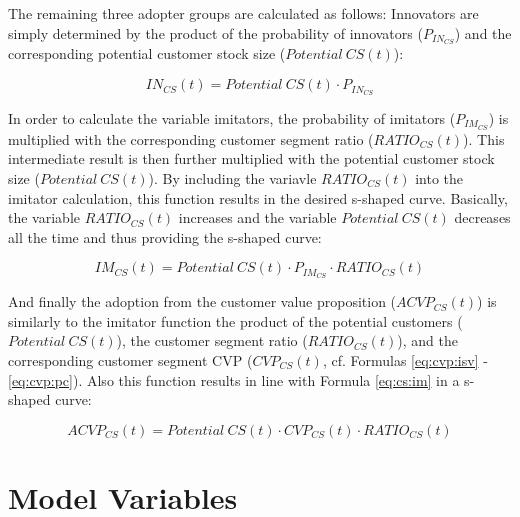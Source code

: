 The remaining three adopter groups are calculated as follows: Innovators are simply determined by the product of the probability of innovators ($P_{IN_{CS}}$) and the corresponding potential customer stock size \linebreak ($\mathit{Potential~CS(t)}$):

\begin{equation}\label{eq:cs:in}
		IN_{CS}(t) = \mathit{Potential~CS(t)} \cdot P_{IN_{CS}}
\end{equation}

In order to calculate the variable imitators, the probability of imitators ($P_{IM_{CS}}$) is multiplied with the corresponding customer segment ratio ($RATIO_{CS}(t)$). This intermediate result is then further multiplied with the potential customer stock size ($\mathit{Potential~CS(t)}$). By including the variavle $RATIO_{CS}(t)$ into the imitator calculation, this function results in the desired s-shaped curve. Basically, the variable $RATIO_{CS}(t)$ increases and the variable $\mathit{Potential~CS(t)}$ decreases all the time and thus providing the s-shaped curve:

\begin{equation}\label{eq:cs:im}
		IM_{CS}(t) = \mathit{Potential~CS(t)} \cdot P_{IM_{CS}} \cdot RATIO_{CS}(t)
\end{equation}

And finally the adoption from the customer value proposition \linebreak ($ACVP_{CS}(t)$) is similarly to the imitator function the product of the potential customers ($\mathit{Potential~CS(t)}$), the customer segment ratio ($RATIO_{CS}(t)$), and the corresponding customer segment \ac{CVP} ($CVP_{CS}(t)$, cf. Formulas \ref{eq:cvp:isv} - \ref{eq:cvp:pc}). Also this function results in line with Formula \ref{eq:cs:im} in a s-shaped curve:

\begin{equation}\label{eq:cs:acvp}
		ACVP_{CS}(t) = \mathit{Potential~CS(t)} \cdot CVP_{CS}(t) \cdot RATIO_{CS}(t)
\end{equation}

\section{Model Variables}\label{ch:sfd:mv}

